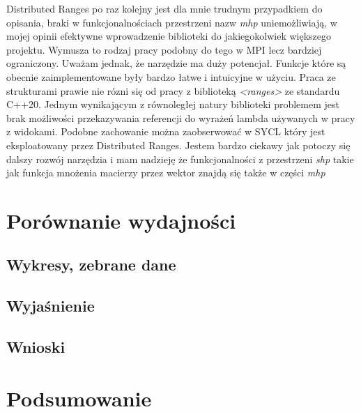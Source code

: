 \documentclass[a4paper,12pt]{book} %
\begin{document}
Distributed Ranges po raz kolejny jest dla mnie trudnym przypadkiem do opisania, braki w funkcjonalnościach przestrzeni nazw \emph{mhp} uniemożliwiają, w mojej opinii efektywne wprowadzenie biblioteki do jakiegokolwiek większego projektu. Wymusza to rodzaj pracy podobny do tego w MPI lecz bardziej ograniczony. Uważam jednak, że narzędzie ma duży potencjał. Funkcje które są obecnie zaimplementowane były bardzo łatwe i intuicyjne w użyciu. Praca ze strukturami prawie nie rózni się od pracy z biblioteką \emph{<ranges>} ze standardu C++20. Jednym wynikającym z równoległej natury biblioteki problemem jest brak możliwości przekazywania referencji do wyrażeń lambda używanych w pracy z widokami. Podobne zachowanie można zaobserwować w SYCL który jest eksploatowany przez Distributed Ranges. Jestem bardzo ciekawy jak potoczy się dalszy rozwój narzędzia i mam nadzieję że funkcjonalności z przestrzeni \emph{shp} takie jak funkcja mnożenia macierzy przez wektor znajdą się także w części \emph{mhp}

\chapter{Porównanie wydajności}
\section{Wykresy, zebrane dane}
\section{Wyjaśnienie}
\section{Wnioski}

\chapter{Podsumowanie}



\listoftables{} %

\listoffigures{} %

\printbibliography
\end{document}
